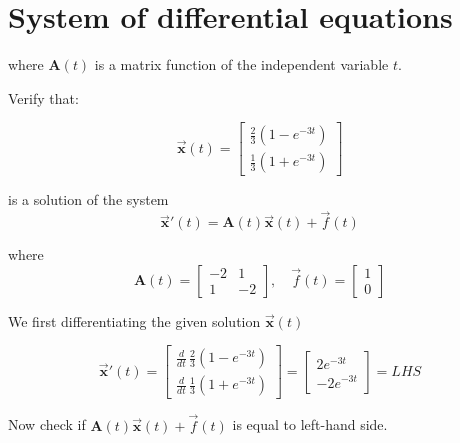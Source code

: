 \chapter{System of differential equations}

\begin{definition}
    where $\mathbf{A}(t)$ is a matrix function of the independent variable $t$.
\end{definition}

\begin{example}
    Verify that:

    \[
        \overrightarrow{\mathbf{x}}(t) = \begin{bmatrix}
            \frac{2}{3}(1 - e^{-3t})\\
            \frac{1}{3}(1 + e^{-3t})
        \end{bmatrix}
    \]

    is a solution of the system 
    \[
        \overrightarrow{\mathbf{x}}'(t) = \mathbf{A}(t)\overrightarrow{\mathbf{x}}(t) + \overrightarrow{f}(t)
    \]

    where 
    \[
        \mathbf{A}(t) = \begin{bmatrix}
            -2 & 1\\ 1 & -2
        \end{bmatrix}, \quad 
        \overrightarrow{f}(t) = \begin{bmatrix}
            1 \\ 0
        \end{bmatrix}
    \]
\end{example}
\begin{solution}
    We first differentiating the given solution $\overrightarrow{\mathbf{x}}(t)$

    \[
        \overrightarrow{\mathbf{x}}'(t) = \begin{bmatrix}
            \displaystyle \frac{d}{dt} \, \frac{2}{3}(1 - e^{-3t})\\[0.8em]
            \displaystyle \frac{d}{dt} \, \frac{1}{3}(1 + e^{-3t})
        \end{bmatrix}
        = \begin{bmatrix}
            2e^{-3t}\\ -2e^{-3t}
        \end{bmatrix} = LHS
    \]

    Now check if $\mathbf{A}(t)\overrightarrow{\mathbf{x}}(t) + \overrightarrow{f}(t)$ is equal to left-hand side.
\end{solution}

